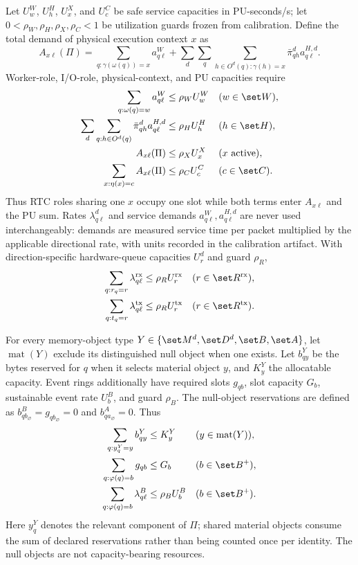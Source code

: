Let $U_w^W$, $U_h^H$, $U_x^X$, and $U_c^C$ be safe service capacities in PU-seconds/s; let $0<\rho_W,\rho_H,\rho_X,\rho_C<1$ be utilization guards frozen from calibration. Define the total demand of physical execution context $x$ as
\begin{equation}
 A_{x\ell}(\Pi)=
 \sum_{q:\gamma(\omega(q))=x}a^W_{q\ell}
 +\sum_d\sum_q\sum_{h\in O^d(q):\gamma(h)=x}
 \bar\pi^d_{qh}a^{H,d}_{q\ell}.
 \label{eq:execution-demand}
\end{equation}
Worker-role, I/O-role, physical-context, and PU capacities require
\begin{align}
 \sum_{q:\omega(q)=w} a^W_{q\ell} &\leq \rho_W U_w^W &&(w\in\set W), \label{eq:worker-capacity}\\
 \sum_{d}\sum_{q:h\in O^d(q)}\bar\pi^d_{qh}a^{H,d}_{q\ell}
 &\leq \rho_H U_h^H &&(h\in\set H), \label{eq:context-capacity}\\
 A_{x\ell}(\Pi)&\leq\rho_XU_x^X &&(x\text{ active}), \label{eq:execution-capacity}\\
 \sum_{x:\eta(x)=c}A_{x\ell}(\Pi)
 &\leq \rho_C U_c^C &&(c\in\set C). \label{eq:pu-capacity}
\end{align}
Thus RTC roles sharing one $x$ occupy one slot while both terms enter $A_{x\ell}$ and the PU sum. Rates $\lambda^d_{q\ell}$ and service demands $a^W_{q\ell},a^{H,d}_{q\ell}$ are never used interchangeably: demands are measured service time per packet multiplied by the applicable directional rate, with units recorded in the calibration artifact. With direction-specific hardware-queue capacities $U_r^d$ and guard $\rho_R$,
\begin{align}
 \sum_{q:r_q=r}\lambda^{\mathrm{rx}}_{q\ell}&\leq\rho_R U_r^{\mathrm{rx}} &&(r\in\set R^{\mathrm{rx}}),\\
 \sum_{q:t_q=r}\lambda^{\mathrm{tx}}_{q\ell}&\leq\rho_R U_r^{\mathrm{tx}} &&(r\in\set R^{\mathrm{tx}}).
 \label{eq:queue-capacity}
\end{align}

For every memory-object type $Y\in\{\set M^d,\set D^d,\set B,\set A\}$, let $\operatorname{mat}(Y)$ exclude its distinguished null object when one exists. Let $b^Y_{qy}$ be the bytes reserved for $q$ when it selects material object $y$, and $K_y^Y$ the allocatable capacity. Event rings additionally have required slots $g_{qb}$, slot capacity $G_b$, sustainable event rate $U_b^B$, and guard $\rho_B$. The null-object reservations are defined as $b^B_{q b_\varnothing}=g_{q b_\varnothing}=0$ and $b^A_{q a_\varnothing}=0$. Thus
\begin{align}
 \sum_{q:y_q^Y=y}b^Y_{qy}&\leq K_y^Y &&(y\in\operatorname{mat}(Y)), \label{eq:memory-capacity}\\
 \sum_{q:\varphi(q)=b}g_{qb}&\leq G_b &&(b\in\set B^+), \label{eq:ring-capacity}\\
 \sum_{q:\varphi(q)=b}\lambda^B_{q\ell}&\leq\rho_B U_b^B &&(b\in\set B^+). \label{eq:ring-rate}
\end{align}
Here $y_q^Y$ denotes the relevant component of $\Pi$; shared material objects consume the sum of declared reservations rather than being counted once per identity. The null objects are not capacity-bearing resources.

